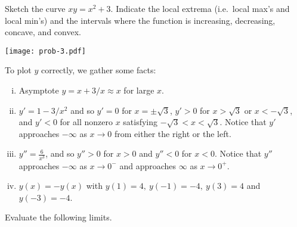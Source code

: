 \documentclass[12pt]{article}
\begin{document}
\newpage
\noindent
{} Sketch the curve $xy = x^2 + 3$.
Indicate the local extrema (i.e.\ local max's and
local min's) and the intervals where the function is
increasing, decreasing, concave, and convex. 

\vspace{-16em}
\begin{center}
    \texttt{[image: prob-3.pdf]}
\end{center}
\vspace{-16em}
To plot $y$ correctly, we gather some facts:
\begin{enumerate}[i)]
\item{}
    Asymptote $y= x + 3/x \approx x$ for large $x$. 
    \item{}
      $ \displaystyle y' = 1 - 3/x^{2}$ and so $y'=0$ for $x = \pm \sqrt{3}$, $y' > 0$ for $x > \sqrt{3}$ or $x < -\sqrt{3}$, and $y' < 0$ for all nonzero $x$ satisfying $- \sqrt{3} < x < \sqrt{3}$. Notice that $y'$ approaches $- \infty$ as $x \to 0$ from either the right or the left.
    \item{} $\displaystyle y'' = \frac{6}{x^{3}}$, and so $y'' > 0$ for $x > 0$ and $y'' < 0$ for $x < 0$. Notice that $y''$ approaches $-\infty$ as $x \to 0^{-}$ and approaches $\infty$ as $x \to 0^{+}$.
        \item{}
       $y(x) = -y(x)$ with $y(1) = 4, \ y(-1) = -4, \ y(3) = 4$ and  $y(-3) = -4$.
\end{enumerate}
\newpage
\noindent
{} Evaluate the following limits. 
\end{document}
